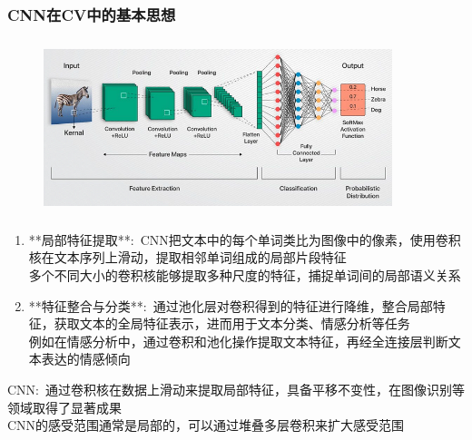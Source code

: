 \begin{frame}
	\frametitle{\textrm{CNN}在\textrm{CV}中的基本思想}
\begin{figure}[h!]
\vspace*{-0.05in}
\centering
\includegraphics[height=2.0in, width=4.0in, viewport=0 0 1080 510,clip]{Figures/CNN-CV-model.png}
\label{CNN-CV-model}
\end{figure}
    \begin{enumerate}
	    \item **局部特征提取**:~\textrm{CNN}把文本中的每个单词类比为图像中的像素，使用卷积核在文本序列上滑动，提取相邻单词组成的局部片段特征\\
		    多个不同大小的卷积核能够提取多种尺度的特征，捕捉单词间的局部语义关系
        \item **特征整合与分类**:~通过池化层对卷积得到的特征进行降维，整合局部特征，获取文本的全局特征表示，进而用于文本分类、情感分析等任务\\
		例如在情感分析中，通过卷积和池化操作提取文本特征，再经全连接层判断文本表达的情感倾向
    \end{enumerate}
	    \textrm{CNN}:~通过卷积核在数据上滑动来提取局部特征，具备平移不变性，在图像识别等领域取得了显著成果\\
		    \textrm{CNN}的感受范围通常是局部的，可以通过堆叠多层卷积来扩大感受范围
\end{frame}

